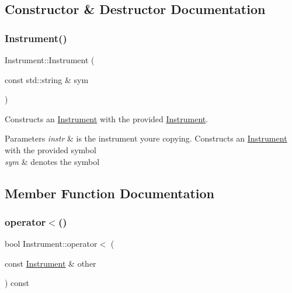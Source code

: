\subsection{Constructor \& Destructor Documentation}
\mbox{\label{classInstrument_af6112f02c5739bd166b78a1734e79b2c}} 
\subsubsection{\texorpdfstring{Instrument()}{Instrument()}}
{\footnotesize\ttfamily Instrument\+::\+Instrument (\begin{DoxyParamCaption}\item[{const std\+::string \&}]{sym }\end{DoxyParamCaption})}



Constructs an \hyperlink{classInstrument}{Instrument} with the provided \hyperlink{classInstrument}{Instrument}. 


\begin{DoxyParams}{Parameters}
{\em instr} & is the instrument you\textquotesingle{}re copying. Constructs an \hyperlink{classInstrument}{Instrument} with the provided symbol \\
\hline
{\em sym} & denotes the symbol \\
\hline
\end{DoxyParams}


\subsection{Member Function Documentation}
\mbox{\label{classInstrument_a8ffc6368e7b12588e422145f2b659f9e}} 
\subsubsection{\texorpdfstring{operator$<$()}{operator<()}}
{\footnotesize\ttfamily bool Instrument\+::operator$<$ (\begin{DoxyParamCaption}\item[{const \hyperlink{classInstrument}{Instrument} \&}]{other }\end{DoxyParamCaption}) const}



